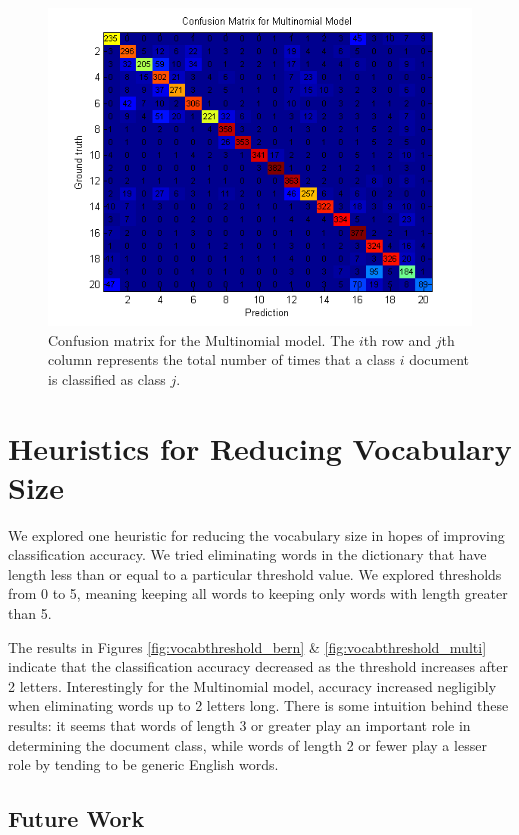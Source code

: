 \documentclass[12pt]{article}
\begin{document}
\begin{figure}[!t]
  \centering
  \includegraphics[scale=1]{img/confusionmat_multi.png}
  \caption{Confusion matrix for the Multinomial model. The \(i\)th row and \(j\)th column represents the total number of times that a class \(i\) document is classified as class \(j\).}
  \label{fig:confusionmat_multi}
\end{figure}

\section{Heuristics for Reducing Vocabulary Size}

We explored one heuristic for reducing the vocabulary size in hopes of improving classification accuracy. We tried eliminating words in the dictionary that have length less than or equal to a particular threshold value. We explored thresholds from 0 to 5, meaning keeping all words to keeping only words with length greater than 5.

The results in Figures \ref{fig:vocabthreshold_bern} \& \ref{fig:vocabthreshold_multi} indicate that the classification accuracy decreased as the threshold increases after 2 letters. Interestingly for the Multinomial model, accuracy increased negligibly when eliminating words up to 2 letters long. There is some intuition behind these results: it seems that words of length 3 or greater play an important role in determining the document class, while words of length 2 or fewer play a lesser role by tending to be generic English words.

\subsection{Future Work}
\end{document}
